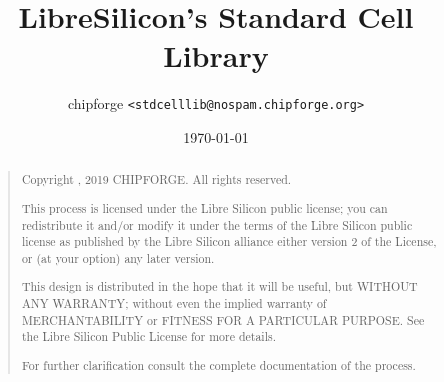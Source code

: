 \documentclass[10pt,a4paper]{report}
\title{LibreSilicon's Standard Cell Library}
\author{chipforge \texttt{<stdcelllib@nospam.chipforge.org>}}
\date{\today}
\begin{document}
\maketitle
\setlength{\parindent}{0pt} %

\begin{abstract}
\begin{quote}
Copyright , 2019 CHIPFORGE. All rights reserved.

This process is licensed under the Libre Silicon public license; you can redistribute it and/or modify it under the terms of the Libre Silicon public license as published by the Libre Silicon alliance either version 2 of the License, or (at your option) any later version.

This design is distributed in the hope that it will be useful, but WITHOUT ANY WARRANTY; without even the implied warranty of MERCHANTABILITY or FITNESS FOR A PARTICULAR PURPOSE. See the Libre Silicon Public License for more details.

For further clarification consult the complete documentation of the process.
\end{quote}
\end{abstract}


\tableofcontents









\end{document}
